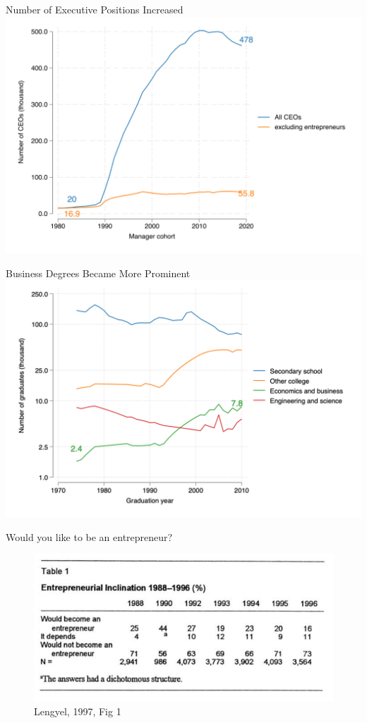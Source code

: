 \documentclass[
  ignorenonframetext,
  aspectratio=1610,
]{beamer}
\begin{document}
\begin{frame}{Number of Executive Positions Increased}
\protect\hypertarget{number-of-executive-positions-increased}{}
\includegraphics{fig/ceo-stock.png}
\end{frame}

\begin{frame}{Business Degrees Became More Prominent}
\protect\hypertarget{business-degrees-became-more-prominent}{}
\includegraphics{fig/school-graduates.png}
\end{frame}

\begin{frame}{Would you like to be an entrepreneur?}
\protect\hypertarget{would-you-like-to-be-an-entrepreneur}{}
\begin{figure}
\centering
\includegraphics{fig/lengyel1997.png}
\caption{Lengyel, 1997, Fig 1}
\end{figure}
\end{frame}
\end{document}
